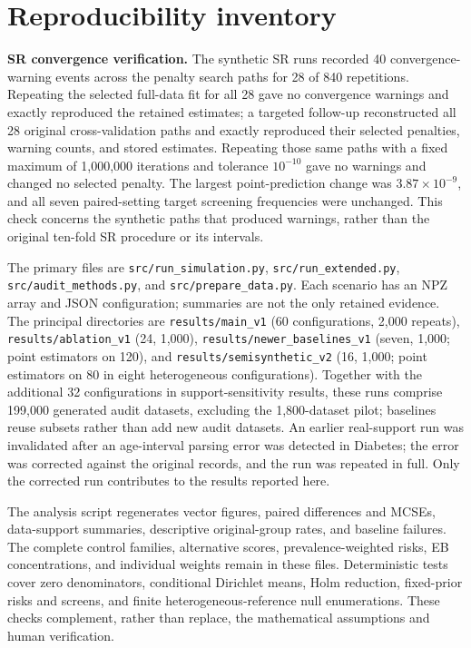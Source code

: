 \documentclass[Afour,sageh,times,doublespace]{sagej}
\begin{document}

\begingroup
\setlength{\bibsep}{0pt}
\renewcommand{\bibfont}{\fontsize{9}{11.7pt}\selectfont}
\let\originalthebibliography\thebibliography
\def\thebibliography#1{\originalthebibliography{#1}\raggedright}

\endgroup

\clearpage
\appendix

\section{Reproducibility inventory}\label{app:inventory}




\textbf{SR convergence verification.} The synthetic SR runs recorded 40 convergence-warning events across the penalty search paths for 28 of 840 repetitions. Repeating the selected full-data fit for all 28 gave no convergence warnings and exactly reproduced the retained estimates; a targeted follow-up reconstructed all 28 original cross-validation paths and exactly reproduced their selected penalties, warning counts, and stored estimates. Repeating those same paths with a fixed maximum of 1,000,000 iterations and tolerance $10^{-10}$ gave no warnings and changed no selected penalty. The largest point-prediction change was $3.87\times10^{-9}$, and all seven paired-setting target screening frequencies were unchanged. This check concerns the synthetic paths that produced warnings, rather than the original ten-fold SR procedure or its intervals.

The primary files are \texttt{src/run\_simulation.py}, \texttt{src/run\_extended.py}, \texttt{src/audit\_methods.py}, and \texttt{src/prepare\_data.py}. Each scenario has an NPZ array and JSON configuration; summaries are not the only retained evidence. The principal directories are \texttt{results/main\_v1} (60 configurations, 2,000 repeats), \texttt{results/ablation\_v1} (24, 1,000), \texttt{results/newer\_baselines\_v1} (seven, 1,000; point estimators on 120), and \texttt{results/semisynthetic\_v2} (16, 1,000; point estimators on 80 in eight heterogeneous configurations). Together with the additional 32 configurations in support-sensitivity results, these runs comprise 199,000 generated audit datasets, excluding the 1,800-dataset pilot; baselines reuse subsets rather than add new audit datasets. An earlier real-support run was invalidated after an age-interval parsing error was detected in Diabetes; the error was corrected against the original records, and the run was repeated in full. Only the corrected run contributes to the results reported here.

The analysis script regenerates vector figures, paired differences and MCSEs, data-support summaries, descriptive original-group rates, and baseline failures. The complete control families, alternative scores, prevalence-weighted risks, EB concentrations, and individual weights remain in these files. Deterministic tests cover zero denominators, conditional Dirichlet means, Holm reduction, fixed-prior risks and screens, and finite heterogeneous-reference null enumerations. These checks complement, rather than replace, the mathematical assumptions and human verification.
\end{document}
